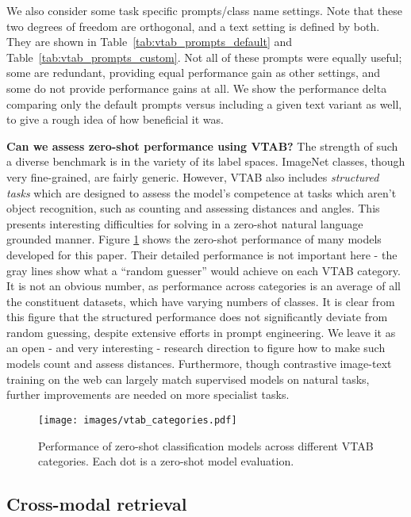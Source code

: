 \documentclass[10pt,twocolumn,letterpaper]{article}
\begin{document}
We also consider some task specific prompts/class name settings. Note that these two degrees of freedom are orthogonal, and a text setting is defined by both. They are shown in  Table~\ref{tab:vtab_prompts_default} and Table~\ref{tab:vtab_prompts_custom}. Not all of these prompts were equally useful; some are redundant, providing equal performance gain as other settings, and some do not provide performance gains at all. We show the performance delta comparing only the default prompts versus including a given text variant as well, to give a rough idea of how beneficial it was.


\textbf{Can we assess zero-shot performance using VTAB?}
The strength of such a diverse benchmark is in the variety of its label spaces. ImageNet classes, though very fine-grained, are fairly generic. However, VTAB also includes \textit{structured tasks} which are designed to assess the model's competence at tasks which aren't object recognition, such as counting and assessing distances and angles.
This presents interesting difficulties for solving in a zero-shot natural language grounded manner. Figure \ref{fig:vtab_cat} shows the zero-shot performance of many models developed for this paper. Their detailed performance is not important here - the gray lines show what a “random guesser” would achieve on each VTAB category. It is not an obvious number, as performance across categories is an average of all the constituent datasets, which have varying numbers of classes.
It is clear from this figure that the structured performance does not significantly deviate from random guessing, despite extensive efforts in prompt engineering. We leave it as an open - and very interesting - research direction to figure how to make such models count and assess distances. Furthermore, though contrastive image-text training on the web can largely match supervised models on natural tasks, further improvements are needed on more specialist tasks.

\begin{figure}[t]
    \centering
    \texttt{[image: images/vtab\_categories.pdf]}
    \caption{Performance of zero-shot classification models across different VTAB categories. Each dot is a zero-shot model evaluation.}
    \label{fig:vtab_cat}
\end{figure}

\subsection{Cross-modal retrieval}
\end{document}
